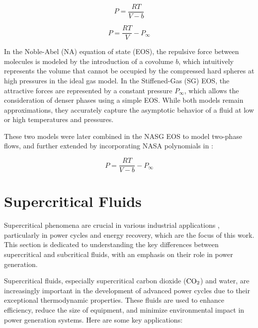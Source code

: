 \begin{equation}
	P = \frac{RT}{V - b} 
\end{equation}

\begin{equation}
	P = \frac{RT}{V} - P_{\infty}
\end{equation}

In the Noble-Abel (NA) equation of state (EOS), the repulsive force between
molecules is modeled by the introduction of a covolume $b$, which intuitively
represents the volume that cannot be occupied by the compressed hard spheres at
high pressures in the ideal gas model. In the Stiffened-Gas (SG) EOS, the
attractive forces are represented by a constant pressure $P_{\infty}$, which allows the
consideration of denser phases using a simple EOS. While both models remain
approximations, they accurately capture the asymptotic behavior of a fluid at
low or high temperatures and pressures. 

These two models were later combined in the NASG EOS \cite{le2016noble} to model
two-phase flows, and further extended by incorporating NASA polynomials in
\cite{boivin2019thermodynamic}:

\begin{equation}
	P = \frac{RT}{V - b} - P_{\infty}
\end{equation}

\section{Supercritical Fluids}

Supercritical phenomena are crucial in various industrial applications
\cite{jofre2021transcritical}, particularly in power cycles and energy recovery,
which are the focus of this work. This section is dedicated to understanding the
key differences between supercritical and subcritical fluids, with an emphasis
on their role in power generation.

Supercritical fluids, especially supercritical carbon dioxide ($\ce{CO2}$) and water,
are increasingly important in the development of advanced power cycles due to
their exceptional thermodynamic properties. These fluids are used to enhance
efficiency, reduce the size of equipment, and minimize environmental impact in
power generation systems. Here are some key applications:

